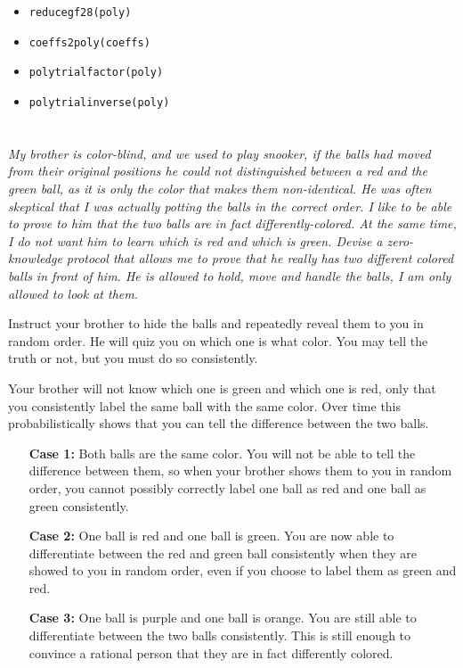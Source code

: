 \documentclass[12pt]{article}
\newcommand{\red}{{\color{red}red}}
\newcommand{\green}{{\color{green}green}}
\newcommand{\purple}{{\color{purple}purple}}
\newcommand{\orange}{{\color{orange}orange}}
\begin{document}
    \begin{itemize}
        \item \texttt{reduce\textunderscore{}gf28(poly)}
        \item \texttt{coeffs2poly(coeffs)}
        \item \texttt{poly\textunderscore{}trial\textunderscore{}factor(poly)}
        \item \texttt{poly\textunderscore{}trial\textunderscore{}inverse(poly)}
    \end{itemize}

\newpage

\section{} \textit{My brother is color-blind, and we used to play snooker, if the balls had moved from their original positions he could not distinguished between a \red{} and the \green{} ball, as it is only the color that makes them non-identical. He was often skeptical that I was actually potting the balls in the correct order. I like to be able to prove to him that the two balls are in fact differently-colored. At the same time, I do not want him to learn which is \red{} and which is \green{}. Devise a zero-knowledge protocol that allows me to prove that he really has two different colored balls in front of him. He is allowed to hold, move and handle the balls, I am only allowed to look at them.}

    Instruct your brother to hide the balls and repeatedly reveal them to you in random order. He will quiz you on which one is what color. You may tell the truth or not, but you must do so consistently.

    Your brother will not know which one is \green{} and which one is \red{}, only that you consistently label the same ball with the same color. Over time this probabilistically shows that you can tell the difference between the two balls.

    \begin{enumerate}
        \item[\textbf{Case 1:}] Both balls are the same color. You will not be able to tell the difference between them, so when your brother shows them to you in random order, you cannot possibly correctly label one ball as \red{} and one ball as \green{} consistently.

        \item[\textbf{Case 2:}] One ball is \red{} and one ball is \green{}. You are now able to differentiate between the \red{} and \green{} ball consistently when they are showed to you in random order, even if you choose to label them as {\color{red}green} and {\color{green}red}.

        \item[\textbf{Case 3:}] One ball is \purple{} and one ball is \orange{}. You are still able to differentiate between the two balls consistently. This is still enough to convince a rational person that they are in fact differently colored.
    \end{enumerate}
\end{document}
